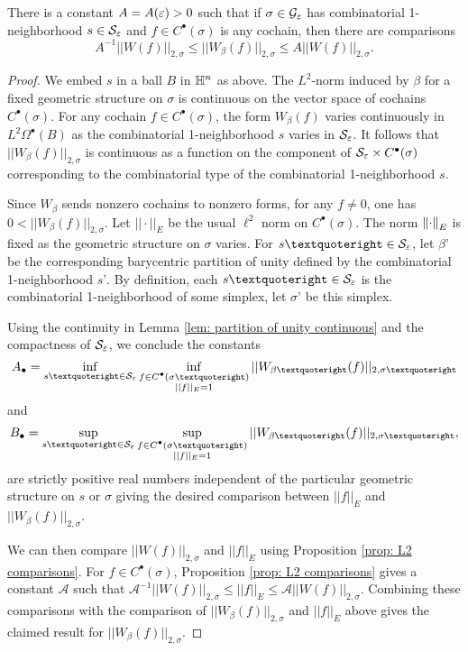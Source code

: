 \begin{prop} \label{prop: smooth L2 comparison} There is a constant $A=A(\varepsilon)>0$ such that if $\sigma\in \mathcal G_\varepsilon$ has combinatorial 1-neighborhood $s\in\mathcal S_\varepsilon$ and $f\in C^{\bullet}(\sigma)$ is any cochain, then there are comparisons $$ A^{-1}||W(f)||_{2,\sigma}\leq ||W_{\beta}(f)||_{2,\sigma}\leq A||W(f)||_{2,\sigma}.$$
\end{prop}
\begin{proof}
    We embed $s$ in a ball $B$ in $\mathbb H^n$ as above. The $L^2$-norm induced by $\beta$ for a fixed geometric structure on $\sigma$ is continuous on the vector space of cochains $C^{\bullet}(\sigma)$. For any cochain $f\in C^{\bullet}(\sigma)$, the form $W_{\beta}(f)$ varies continuously in $L^2\Omega^{\bullet}(B)$ as the combinatorial 1-neighborhood $s$ varies in $\mathcal S_\varepsilon$.
    It follows that $||W_{\beta}(f)||_{2,\sigma}$ is continuous as a function on the component of $\mathcal S_\varepsilon \times C^{\bullet}(\sigma)$ corresponding to the combinatorial type of the combinatorial 1-neighborhood $s$.

    Since $W_{\beta}$ sends nonzero cochains to nonzero forms, for any $f\neq 0$, one has $0<||W_{\beta}(f)||_{2,\sigma}$. Let $||\cdot||_{E}$ be the usual $\ell^2$ norm on $C^{\bullet}(\sigma)$.
    The norm $\left\lVert\cdot\right\rVert_E$ is fixed as the geometric structure on $\sigma$ varies. For $s’\in \mathcal S_\e$, let $\beta’$ be the corresponding  barycentric partition of unity defined by the combinatorial 1-neighborhood $s’$. By definition, each $s’\in\mathcal S_\e$ is the combinatorial 1-neighborhood of some simplex, let $\sigma’$ be this simplex.

    Using the continuity in Lemma \ref{lem: partition of unity continuous} and the compactness of $\mathcal S_\varepsilon$, we conclude the constants
    $$A_{\bullet} = \inf\limits_{s’\in \mathcal S_\e}\inf\limits _{\substack{f\in C^{\bullet}(\sigma’)\\ ||f||_{E} = 1}} ||W_{\beta’}(f)||_{2, \sigma’}$$
    and
    $$B_{\bullet}= \sup\limits_{s’\in \mathcal S_\e}\sup\limits_{\substack{f\in C^{\bullet}(\sigma’)\\ ||f||_{E} = 1}} ||W_{\beta’}(f)||_{2, \sigma’},$$
    are strictly positive real numbers independent of the particular geometric structure on $s$ or $\sigma$ giving the desired comparison between $||f||_E$ and $||W_{\beta}(f)||_{2,\sigma}$.

    We can then compare $||W(f)||_{2,\sigma}$ and $||f||_E$ using Proposition \ref{prop: L2 comparisons}. For $f\in C^{\bullet}(\sigma)$, Proposition \ref{prop: L2 comparisons} gives a constant $\mathcal A$ such that $\mathcal A^{-1}||W(f)||_{2,\sigma} \leq ||f||_{E}\leq \mathcal A||W(f)||_{2,\sigma}$.
    Combining these comparisons with the comparison of $||W_{\beta}(f)||_{2,\sigma} $ and $||f||_{E}$ above gives the claimed result for $||W_{\beta}(f)||_{2,\sigma} $.
\end{proof}

